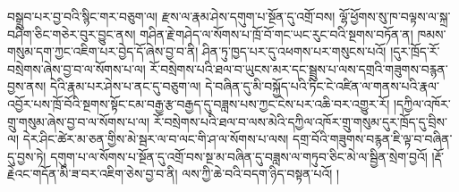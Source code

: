 བསྒྲུབ་པར་བྱ་བའི་སྙིང་གར་བཅུག་ལ། རྫས་ལ་རྣམ་ཤེས་དགུག་པ་སྔོན་དུ་འགྲོ་བས། ལྷོ་ཕྱོགས་སུ་ཁ་བལྟས་ལ་སྐྲ་བཤིག་ཅིང་གཅེར་བུར་བྱུང་ནས། གཤིན་རྗེ་གཤེད་ལ་སོགས་པ་ཁྲོ་བོ་གང་ཡང་རུང་བའི་སྔགས་བཏོན་ན། ཁམས་གསུམ་དག་ཀྱང་འཇིག་པར་བྱེད་དོ་ཞེས་བྱ་བ་ནི། ཤིན་ཏུ་ཁྱད་པར་དུ་འཕགས་པར་གསུངས་པའོ། །དུར་ཁྲོད་རོ་བསྲེགས་ཞེས་བྱ་བ་ལ་སོགས་པ་ལ། རོ་བསྲེགས་པའི་ཐལ་བ་ཡུངས་མར་དང་སྦྲུས་པ་ལས་དགྲའི་གཟུགས་བརྙན་བྱས་ནས། དེའི་རྣམ་པར་ཤེས་པ་ནང་དུ་བཅུག་ལ། དེ་བཞིན་དུ་མི་བསྐྱོད་པའི་ཏིང་ངེ་འཛིན་ལ་གནས་པའི་རྣལ་འབྱོར་པས་ཁྲོ་བོའི་སྔགས་སྟོང་ངམ་བརྒྱ་རྩ་བརྒྱད་དུ་བཟླས་པས་ཀྱང་ངེས་པར་འཆི་བར་འགྱུར་རོ། །དཀྱིལ་འཁོར་གྲུ་གསུམ་ཞེས་བྱ་བ་ལ་སོགས་པ་ལ། རོ་བསྲེགས་པའི་ཐལ་བ་ལས་མེའི་དཀྱིལ་འཁོར་གྲུ་གསུམ་དུར་ཁྲོད་དུ་བྲིས་ལ། དེར་ཤིང་ཚེར་མ་ཅན་གྱིས་མེ་སྦར་ལ་བ་ལང་གི་ཤ་ལ་སོགས་པ་ལས། དགྲ་བོའི་གཟུགས་བརྙན་ཇི་ལྟ་བ་བཞིན་དུ་བྱས་ཏེ། དགུག་པ་ལ་སོགས་པ་སྔོན་དུ་འགྲོ་བས་སྔ་མ་བཞིན་དུ་བཟླས་ལ་གཏུབ་ཅིང་མེ་ལ་སྦྱིན་སྲེག་བྱའོ། །རྡོ་རྗེའང་གདོན་མི་ཟ་བར་འཇིག་ཅེས་བྱ་བ་ནི། ལས་ཀྱི་ཆེ་བའི་བདག་ཉིད་བསྟན་པའོ། །
